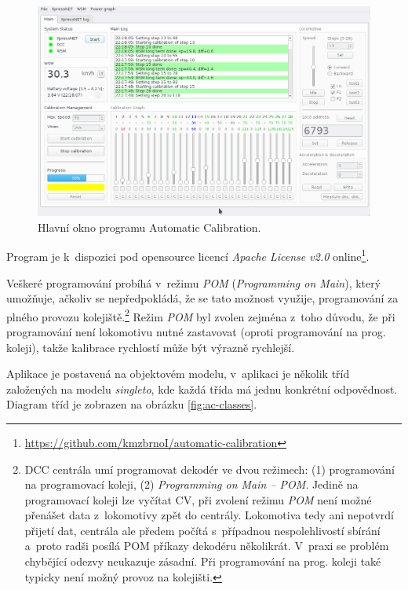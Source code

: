 \begin{figure}[h]
\includegraphics[width=\textwidth]{data/ac_progress.png}
\caption{Hlavní okno programu Automatic Calibration.}
\label{fig:ac-gui}
\end{figure}

Program je k~dispozici pod opensource licencí \textit{Apache License v2.0}
online\footnote{\url{https://github.com/kmzbrnoI/automatic-calibration}}.

Veškeré programování probíhá v~režimu \textit{POM} (\textit{Programming on
Main}), který umožňuje, ačkoliv se nepředpokládá, že se tato možnost využije,
programování za plného provozu kolejiště.\footnote{DCC centrála umí programovat
dekodér ve dvou režimech: (1) programování na programovací koleji, (2)
\textit{Programming on Main -- POM}. Jedině na programovací koleji lze vyčítat
CV, při zvolení režimu \textit{POM} není možné přenášet data z~lokomotivy zpět
do centrály.  Lokomotiva tedy ani nepotvrdí přijetí dat, centrála ale předem
počítá s~případnou nespolehlivostí sbírání a~proto radši posílá POM příkazy
dekodéru několikrát.  V~praxi se problém chybějící odezvy neukazuje zásadní.
Při programování na prog.  koleji také typicky není možný provoz na kolejišti.}
Režim \textit{POM} byl zvolen zejména z~toho důvodu, že při programování není
lokomotivu nutné zastavovat (oproti programování na prog. koleji), takže
kalibrace rychlostí může být výrazně rychlejší.

Aplikace je postavená na objektovém modelu, v~aplikaci je několik tříd
založených na modelu \textit{singleto}, kde každá třída má jednu konkrétní
odpovědnost. Diagram tříd je zobrazen na obrázku
\ref{fig:ac-classes}.

